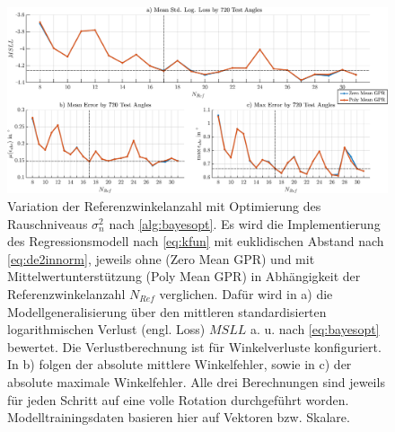 \clearpage
\begin{landscape}
\begin{figure}[tbph]
	\centering
	\includegraphics[width=\linewidth]{chapters/images/4-EuOExp/MSLL-vs-Errors}
	\caption[Variation der Referenzwinkelanzahl mit Optimierung des Rauschniveau]{Variation der Referenzwinkelanzahl mit Optimierung des Rauschniveaus $\sigma_n^2$ nach \autoref{alg:bayesopt}. Es wird die Implementierung des Regressionsmodell nach \autoref{eq:kfun} mit euklidischen Abstand nach \autoref{eq:de2innorm}, jeweils ohne (Zero Mean GPR) und mit Mittelwertunterstützung (Poly Mean GPR) in Abhängigkeit der Referenzwinkelanzahl $N_{Ref}$ verglichen. Dafür wird in a) die Modellgeneralisierung über den mittleren standardisierten logarithmischen Verlust (engl. Loss) $MSLL$ a. u. nach \autoref{eq:bayesopt} bewertet. Die Verlustberechnung ist für Winkelverluste konfiguriert. In b) folgen der absolute mittlere Winkelfehler, sowie in c) der absolute maximale Winkelfehler. Alle drei Berechnungen sind jeweils für jeden Schritt auf eine volle Rotation durchgeführt worden. Modelltrainingsdaten basieren hier auf Vektoren bzw. Skalare.}
	\label{fig:msll-vs-errors}
\end{figure}
\end{landscape}


\clearpage


